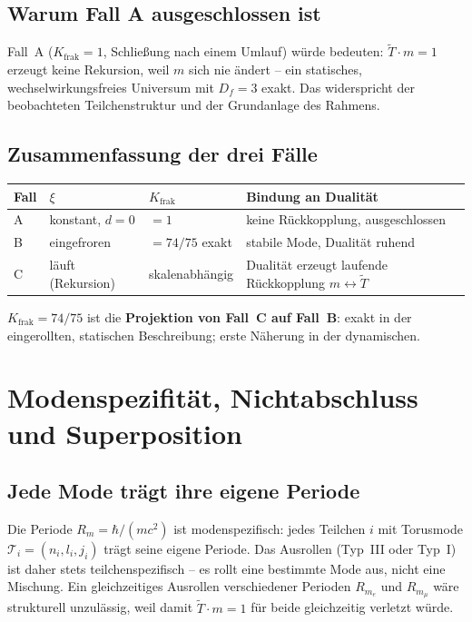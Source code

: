 \subsection{Warum Fall A ausgeschlossen ist}

Fall~A ($K_{\text{frak}}=1$, Schließung nach einem Umlauf) würde
bedeuten: $\tilde{T}\cdot m=1$ erzeugt keine Rekursion, weil $m$
sich nie ändert -- ein statisches, wechselwirkungsfreies Universum
mit $D_f=3$ exakt. Das widerspricht der beobachteten Teilchenstruktur
und der Grundanlage des Rahmens.

\subsection{Zusammenfassung der drei Fälle}

\begin{center}
\begin{tabular}{p{1.2cm}p{3.5cm}p{3.5cm}p{3.5cm}}
\toprule
\textbf{Fall} & \textbf{$\xi$} & \textbf{$K_{\text{frak}}$} &
\textbf{Bindung an Dualität} \\
\midrule
A & konstant, $d=0$ & $=1$ & keine Rückkopplung, ausgeschlossen \\
B & eingefroren & $=74/75$ exakt & stabile Mode, Dualität ruhend \\
C & läuft (Rekursion) & skalenabhängig & Dualität erzeugt laufende
  Rückkopplung $m\leftrightarrow\tilde{T}$ \\
\bottomrule
\end{tabular}
\end{center}

$K_{\text{frak}}=74/75$ ist die \textbf{Projektion von Fall~C auf
Fall~B}: exakt in der eingerollten, statischen Beschreibung; erste
Näherung in der dynamischen.

\section{Modenspezifität, Nichtabschluss und Superposition}

\subsection{Jede Mode trägt ihre eigene Periode}

Die Periode $R_m = \hbar/(mc^2)$ ist modenspezifisch: jedes Teilchen
$i$ mit Torusmode $\mathcal{T}_i=(n_i,l_i,j_i)$ trägt seine eigene
Periode. Das Ausrollen (Typ~III oder Typ~I) ist daher stets
teilchenspezifisch -- es rollt eine bestimmte Mode aus, nicht eine
Mischung. Ein gleichzeitiges Ausrollen verschiedener Perioden
$R_{m_e}$ und $R_{m_\mu}$ wäre strukturell unzulässig, weil damit
$\tilde{T}\cdot m=1$ für beide gleichzeitig verletzt würde.

